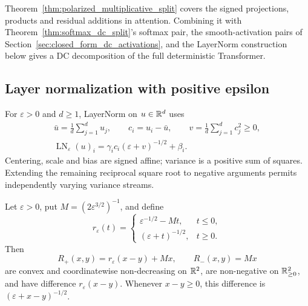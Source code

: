 Theorem~\ref{thm:polarized_multiplicative_split} covers the signed projections, products and residual additions in attention. Combining it with Theorem~\ref{thm:softmax_dc_split}'s softmax pair, the smooth-activation pairs of Section~\ref{sec:closed_form_dc_activations}, and the LayerNorm construction below gives a DC decomposition of the full deterministic Transformer.

\subsection{Layer normalization with positive epsilon}

For $\varepsilon>0$ and $d\ge1$, LayerNorm on $u\in\mathbb{R}^d$ uses
\begin{equation}
\begin{gathered}
    \bar u=\frac1d\sum_{j=1}^d u_j,\qquad c_i=u_i-\bar u,
    \qquad v=\frac1d\sum_{j=1}^d c_j^2\ge0,\\
    \operatorname{LN}_{\varepsilon}(u)_i
    =\gamma_i c_i(\varepsilon+v)^{-1/2}+\beta_i.
\end{gathered}
    \label{eq:layernorm_dc_definition}
\end{equation}
Centering, scale and bias are signed affine; variance is a positive sum of squares. Extending the remaining reciprocal square root to negative arguments permits independently varying variance streams.

\begin{proposition}\label{prop:reciprocal_sqrt_pair}
Let $\varepsilon>0$, put $M=(2\varepsilon^{3/2})^{-1}$, and define
\begin{equation}
    r_{\varepsilon}(t)=
    \begin{cases}
        \varepsilon^{-1/2}-Mt,&t\le0,\\
        (\varepsilon+t)^{-1/2},&t\ge0.
    \end{cases}
    \label{eq:reciprocal_sqrt_extension}
\end{equation}
Then
\begin{equation}
    R_+(x,y)=r_{\varepsilon}(x-y)+Mx,
    \qquad R_-(x,y)=Mx
    \label{eq:reciprocal_sqrt_pair}
\end{equation}
are convex and coordinatewise non-decreasing on $\mathbb{R}^2$, are non-negative on $\mathbb{R}^2_{\ge0}$, and have difference $r_{\varepsilon}(x-y)$. Whenever $x-y\ge0$, this difference is $(\varepsilon+x-y)^{-1/2}$.
\end{proposition}

